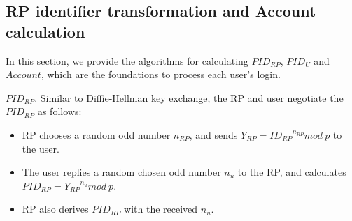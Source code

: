 \subsection{RP identifier transformation and Account calculation}
\label{subsec:identifier-generation}
In this section, we provide the algorithms for  calculating  $PID_{RP}$, $PID_U$ and $Account$,
which are the foundations to process each user's login. %

\noindent\textbf{$PID_{RP}$}. Similar to Diffie-Hellman key exchange\cite{DiffieH76}, the RP and user negotiate the  $PID_{RP}$ as follows:
\begin{itemize}
  \item RP chooses a random odd number $n_{RP}$, and sends $Y_{RP} = {ID_{RP}}^{n_{RP}} mod \ p$ to the user.
  \item The user replies a random chosen odd number $n_{u}$ to the RP, and calculates $PID_{RP} = {Y_{RP}}^{n_{u}} mod \ p$.
  \item RP also derives $PID_{RP}$ with the received $n_{u}$.
\end{itemize}

